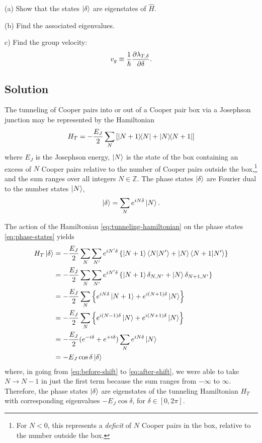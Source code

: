 \documentclass[12pt]{article}
\begin{document}
\begin{appendices}
    (a) Show that the states $\ket{\delta}$ are eigenstates of $\hat{H}$.
    
    (b) Find the associated eigenvalues. 
    
    c) Find the group velocity: \begin{equation}
    v_g \equiv \frac{1}{\hbar} \pdv{\lambda_{T,\delta}}{\delta}.
\end{equation}
\subsection*{Solution}



The tunneling of Cooper pairs into or out of a Cooper pair box via a Josephson junction may be represented by the Hamiltonian
\begin{equation}
    H_T = -\frac{E_J}{2} \sum_N
    \left[\ketbra{N+1}{N} + \ketbra{N}{N+1}\right]
    \label{eq:tunneling-hamiltonian}
\end{equation}
where $E_J$ is the Josephson energy, $\ket{N}$ is the state of the box containing an excess of $N$ Cooper pairs relative to the number of Cooper pairs outside the box,\footnote{For $N<0$, this represents a \emph{deficit} of $N$ Cooper pairs in the box, relative to the number outside the box.} and the sum ranges over all integers $N \in \mathbb{Z}$.
The phase states $\ket{\delta}$ are Fourier dual to the number states $\ket{N}$,
\begin{equation}
    \ket{\delta} = \sum_N e^{iN\delta}\ket{N}.
    \label{eq:phase-states}
\end{equation}

The action of the Hamiltonian \eqref{eq:tunneling-hamiltonian} on the phase states \eqref{eq:phase-states} yields
\begin{alignat}{1}
    H_T\ket{\delta}
    &= -\frac{E_J}{2}
    \sum_N \sum_{N'}
    e^{iN'\delta} \left\{
        \ket{N+1}\braket{N}{N'} + \ket{N}\braket{N+1}{N'}
    \right\} \\
    &= -\frac{E_J}{2}
    \sum_N \sum_{N'}
    e^{iN'\delta} \left\{
        \ket{N+1}\delta_{N,N'} + \ket{N}\delta_{N+1,N'}
    \right\} \\
    &= -\frac{E_J}{2}
    \sum_N
    \left\{
        e^{iN\delta}\ket{N+1} + e^{i(N+1)\delta}\ket{N}
    \right\} \label{eq:before-shift} \\
    &= -\frac{E_J}{2}
    \sum_N
    \left\{
        e^{i(N-1)\delta}\ket{N} + e^{i(N+1)\delta}\ket{N}
    \right\} \label{eq:after-shift} \\
    &= -\frac{E_J}{2}(e^{-i\delta} + e^{+i\delta})
    \sum_N e^{iN\delta} \ket{N} \\
    &= -E_J\cos\delta\ket{\delta}
\end{alignat}
where, in going from \eqref{eq:before-shift} to \eqref{eq:after-shift}, we were able to take $N \rightarrow N-1$ in just the first term because the sum ranges from $-\infty$ to $\infty$. Therefore, the phase states $\ket{\delta}$ are eigenstates of the tunneling Hamiltonian $H_T$ with corresponding eigenvalues $-E_J\cos\delta$, for $\delta \in [0, 2\pi]$.


\end{appendices}
\end{document}

